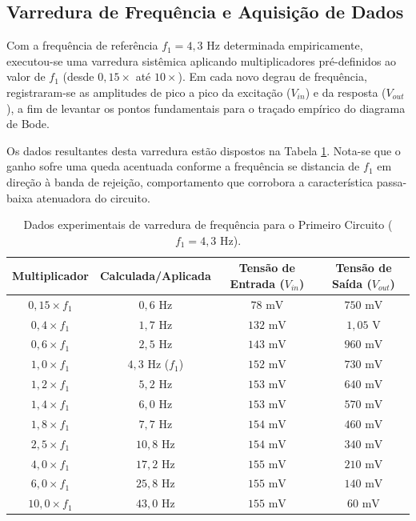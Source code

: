 \subsection{Varredura de Frequência e Aquisição de Dados}

Com a frequência de referência $f_1 = 4,3\text{ Hz}$ determinada empiricamente, executou-se uma varredura sistêmica aplicando multiplicadores pré-definidos ao valor de $f_1$ (desde $0,15\times$ até $10\times$). Em cada novo degrau de frequência, registraram-se as amplitudes de pico a pico da excitação ($V_{in}$) e da resposta ($V_{out}$), a fim de levantar os pontos fundamentais para o traçado empírico do diagrama de Bode. 

Os dados resultantes desta varredura estão dispostos na Tabela \ref{tab:varredura_c1}. Nota-se que o ganho sofre uma queda acentuada conforme a frequência se distancia de $f_1$ em direção à banda de rejeição, comportamento que corrobora a característica passa-baixa atenuadora do circuito.

\begin{table}[H]
	\centering
	\caption{Dados experimentais de varredura de frequência para o Primeiro Circuito ($f_1 = 4,3\text{ Hz}$).}
	\label{tab:varredura_c1}
	\renewcommand{\arraystretch}{1.2}
	\begin{tabular}{cccc}
		\hline
		\textbf{Multiplicador} & \textbf{\textflorin  Calculada/Aplicada} & \textbf{Tensão de Entrada ($V_{in}$)} & \textbf{Tensão de Saída ($V_{out}$)} \\ \hline
		$0,15 \times f_1$ & $0,6\text{ Hz}$ & $78\text{ mV}$ & $750\text{ mV}$ \\
		$0,4 \times f_1$ & $1,7\text{ Hz}$ & $132\text{ mV}$ & $1,05\text{ V}$ \\
		$0,6 \times f_1$ & $2,5\text{ Hz}$ & $143\text{ mV}$ & $960\text{ mV}$ \\
		$1,0 \times f_1$ & $4,3\text{ Hz}$ ($f_1$) & $152\text{ mV}$ & $730\text{ mV}$ \\
		$1,2 \times f_1$ & $5,2\text{ Hz}$ & $153\text{ mV}$ & $640\text{ mV}$ \\
		$1,4 \times f_1$ & $6,0\text{ Hz}$ & $153\text{ mV}$ & $570\text{ mV}$ \\
		$1,8 \times f_1$ & $7,7\text{ Hz}$ & $154\text{ mV}$ & $460\text{ mV}$ \\
		$2,5 \times f_1$ & $10,8\text{ Hz}$ & $154\text{ mV}$ & $340\text{ mV}$ \\
		$4,0 \times f_1$ & $17,2\text{ Hz}$ & $155\text{ mV}$ & $210\text{ mV}$ \\
		$6,0 \times f_1$ & $25,8\text{ Hz}$ & $155\text{ mV}$ & $140\text{ mV}$ \\
		$10,0 \times f_1$ & $43,0\text{ Hz}$ & $155\text{ mV}$ & $60\text{ mV}$ \\ \hline
	\end{tabular}
\end{table}

